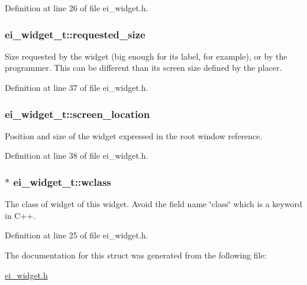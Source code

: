 Definition at line 26 of file ei\+\_\+widget.\+h.

\hypertarget{structei__widget__t_ae82b19958b3ec72a855986dffb9b92ea}{
\subsubsection[{requested\+\_\+size}]{ ei\+\_\+widget\+\_\+t\+::requested\+\_\+size}}\label{structei__widget__t_ae82b19958b3ec72a855986dffb9b92ea}


Size requested by the widget (big enough for its label, for example), or by the programmer. This can be different than its screen size defined by the placer. 



Definition at line 37 of file ei\+\_\+widget.\+h.

\hypertarget{structei__widget__t_ad139e1541329b54e0b4c8d746e14b204}{
\subsubsection[{screen\+\_\+location}]{ ei\+\_\+widget\+\_\+t\+::screen\+\_\+location}}\label{structei__widget__t_ad139e1541329b54e0b4c8d746e14b204}


Position and size of the widget expressed in the root window reference. 



Definition at line 38 of file ei\+\_\+widget.\+h.

\hypertarget{structei__widget__t_a429e970e1d266252df4dbe55296b9f70}{
\subsubsection[{wclass}]{$\ast$ ei\+\_\+widget\+\_\+t\+::wclass}}\label{structei__widget__t_a429e970e1d266252df4dbe55296b9f70}


The class of widget of this widget. Avoid the field name \char`\"{}class\char`\"{} which is a keyword in C++. 



Definition at line 25 of file ei\+\_\+widget.\+h.



The documentation for this struct was generated from the following file\+:\begin{DoxyCompactItemize}
\item 
\hyperlink{ei__widget_8h}{ei\+\_\+widget.\+h}\end{DoxyCompactItemize}
